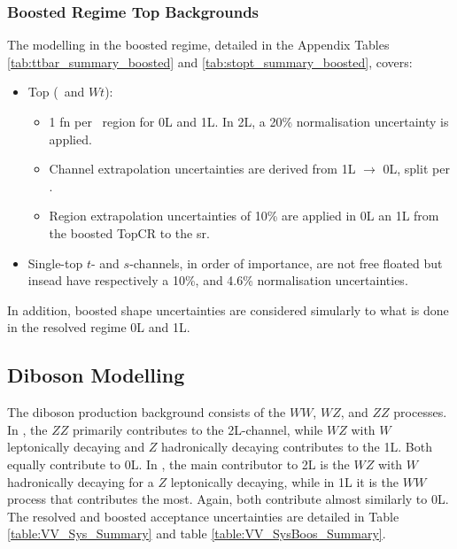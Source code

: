 \subsubsection{Boosted Regime Top Backgrounds} 
The modelling in the boosted regime, detailed in the Appendix Tables \ref{tab:ttbar_summary_boosted} and \ref{tab:stopt_summary_boosted}, covers:
\begin{itemize}[leftmargin=*]
    \item Top (\ttb\ and $Wt$): 
    \begin{itemize}
        \item 1 \gls{fn} per \ptv\ region for 0L and 1L. In 2L, a 20\% normalisation uncertainty is applied. 
        \item Channel extrapolation uncertainties are derived from 1L $\rightarrow$ 0L, split per \ptv.
        \item Region extrapolation uncertainties of 10\% are applied in 0L an 1L from the boosted TopCR to the \gls{sr}.
    \end{itemize}
    \item Single-top $t$- and $s$-channels, in order of importance, are not free floated but insead have respectively a 10\%, and 4.6\% normalisation uncertainties.
\end{itemize}
In addition, boosted shape uncertainties are considered simularly to what is done in the resolved regime 0L and 1L.

\subsection{Diboson Modelling}
The diboson production background consists of the $WW$, $WZ$, and $ZZ$ processes. In \vhb, the $ZZ$ primarily contributes to the 2L-channel, while $WZ$ with $W$ leptonically decaying and $Z$ hadronically decaying contributes to the 1L. Both equally contribute to 0L. In \vhc, the main contributor to 2L is the $WZ$ with $W$ hadronically decaying for a $Z$ leptonically decaying, while in 1L it is the $WW$ process that contributes the most. Again, both contribute almost similarly to 0L. The resolved and boosted acceptance uncertainties are detailed in Table \ref{table:VV_Sys_Summary} and table \ref{table:VV_SysBoos_Summary}. \\

